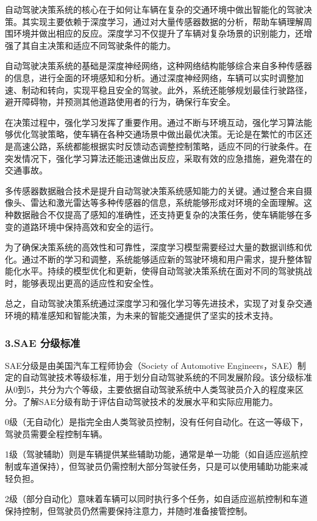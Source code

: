 自动驾驶决策系统的核心在于如何让车辆在复杂的交通环境中做出智能化的驾驶决策。其实现主要依赖于深度学习，通过对大量传感器数据的分析，帮助车辆理解周围环境并做出相应的反应。深度学习不仅提升了车辆对复杂场景的识别能力，还增强了其自主决策和适应不同驾驶条件的能力。

自动驾驶决策系统的基础是深度神经网络，这种网络结构能够综合来自多种传感器的信息，进行全面的环境感知和分析。通过深度神经网络，车辆可以实时调整加速、制动和转向，实现平稳且安全的驾驶。此外，系统还能够规划最佳行驶路径，避开障碍物，并预测其他道路使用者的行为，确保行车安全。

在决策过程中，强化学习发挥了重要作用。通过不断与环境互动，强化学习算法能够优化驾驶策略，使车辆在各种交通场景中做出最优决策。无论是在繁忙的市区还是高速公路，系统都能根据实时反馈动态调整控制策略，适应不同的行驶条件。在突发情况下，强化学习算法还能迅速做出反应，采取有效的应急措施，避免潜在的交通事故。

多传感器数据融合技术是提升自动驾驶决策系统感知能力的关键。通过整合来自摄像头、雷达和激光雷达等多种传感器的信息，系统能够形成对环境的全面理解。这种数据融合不仅提高了感知的准确性，还支持更复杂的决策任务，使车辆能够在多变的道路环境中保持高效和安全的运行。

为了确保决策系统的高效性和可靠性，深度学习模型需要经过大量的数据训练和优化。通过不断的学习和调整，系统能够适应新的驾驶环境和用户需求，提升整体智能化水平。持续的模型优化和更新，使得自动驾驶决策系统在面对不同的驾驶挑战时，能够表现出更高的适应性和安全性。

总之，自动驾驶决策系统通过深度学习和强化学习等先进技术，实现了对复杂交通环境的精准感知和智能决策，为未来的智能交通提供了坚实的技术支持。

\subsubsection{3.SAE 分级标准}
SAE分级是由美国汽车工程师协会（Society of Automotive Engineers，SAE）制定的自动驾驶技术等级标准，用于划分自动驾驶系统的不同发展阶段。该分级标准从0到5，共分为六个等级，主要依据自动驾驶系统中人类驾驶员介入的程度来区分。了解SAE分级有助于评估自动驾驶技术的发展水平和实际应用能力。

0级（无自动化）是指完全由人类驾驶员控制，没有任何自动化。在这一等级下，驾驶员需要全程控制车辆。

1级（驾驶辅助）则是车辆提供某些辅助功能，通常是单一功能（如自适应巡航控制或车道保持），但驾驶员仍需控制大部分驾驶任务，只是可以使用辅助功能来减轻负担。

2级（部分自动化）意味着车辆可以同时执行多个任务，如自适应巡航控制和车道保持控制，但驾驶员仍然需要保持注意力，并随时准备接管控制。

